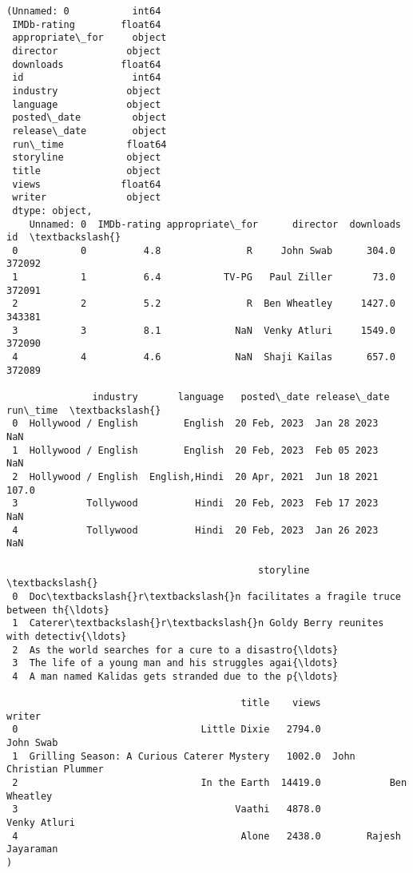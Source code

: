 \documentclass[11pt]{article}
\makeatletter
\newcommand{\boxspacing}{\kern\kvtcb@left@rule\kern\kvtcb@boxsep}
\newcommand{\prompt}[4]{
        {\ttfamily\llap{{\color{#2}[#3]:\hspace{3pt}#4}}\vspace{-\baselineskip}}
    }
\makeatother
\begin{document}
            \begin{tcolorbox}[breakable, size=fbox, boxrule=.5pt, pad at break*=1mm, opacityfill=0]
\prompt{Out}{outcolor}{26}{\boxspacing}
\begin{Verbatim}[commandchars=\\\{\}]
(Unnamed: 0           int64
 IMDb-rating        float64
 appropriate\_for     object
 director            object
 downloads          float64
 id                   int64
 industry            object
 language            object
 posted\_date         object
 release\_date        object
 run\_time           float64
 storyline           object
 title               object
 views              float64
 writer              object
 dtype: object,
    Unnamed: 0  IMDb-rating appropriate\_for      director  downloads      id  \textbackslash{}
 0           0          4.8               R     John Swab      304.0  372092
 1           1          6.4           TV-PG   Paul Ziller       73.0  372091
 2           2          5.2               R  Ben Wheatley     1427.0  343381
 3           3          8.1             NaN  Venky Atluri     1549.0  372090
 4           4          4.6             NaN  Shaji Kailas      657.0  372089

               industry       language   posted\_date release\_date  run\_time  \textbackslash{}
 0  Hollywood / English        English  20 Feb, 2023  Jan 28 2023       NaN
 1  Hollywood / English        English  20 Feb, 2023  Feb 05 2023       NaN
 2  Hollywood / English  English,Hindi  20 Apr, 2021  Jun 18 2021     107.0
 3            Tollywood          Hindi  20 Feb, 2023  Feb 17 2023       NaN
 4            Tollywood          Hindi  20 Feb, 2023  Jan 26 2023       NaN

                                            storyline  \textbackslash{}
 0  Doc\textbackslash{}r\textbackslash{}n facilitates a fragile truce between th{\ldots}
 1  Caterer\textbackslash{}r\textbackslash{}n Goldy Berry reunites with detectiv{\ldots}
 2  As the world searches for a cure to a disastro{\ldots}
 3  The life of a young man and his struggles agai{\ldots}
 4  A man named Kalidas gets stranded due to the p{\ldots}

                                         title    views                  writer
 0                                Little Dixie   2794.0               John Swab
 1  Grilling Season: A Curious Caterer Mystery   1002.0  John Christian Plummer
 2                                In the Earth  14419.0            Ben Wheatley
 3                                      Vaathi   4878.0            Venky Atluri
 4                                       Alone   2438.0        Rajesh Jayaraman
)
\end{Verbatim}
\end{tcolorbox}
        
\end{document}

